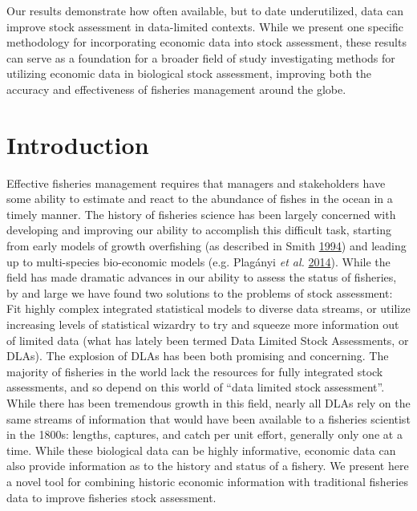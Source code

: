 \documentclass[twoside,12pt,final]{ucthesis-CA2012}
\begin{document}
\begin{ucmainmatter}
Our results demonstrate how often available, but to date underutilized,
data can improve stock assessment in data-limited contexts. While we
present one specific methodology for incorporating economic data into
stock assessment, these results can serve as a foundation for a broader
field of study investigating methods for utilizing economic data in
biological stock assessment, improving both the accuracy and
effectiveness of fisheries management around the globe.

\section{Introduction}\label{introduction-3}

Effective fisheries management requires that managers and stakeholders
have some ability to estimate and react to the abundance of fishes in
the ocean in a timely manner. The history of fisheries science has been
largely concerned with developing and improving our ability to
accomplish this difficult task, starting from early models of growth
overfishing (as described in Smith
\protect\hyperlink{ref-Smith1994}{1994}) and leading up to multi-species
bio-economic models (e.g. Plagányi \emph{et al.}
\protect\hyperlink{ref-Plaganyi2014}{2014}). While the field has made
dramatic advances in our ability to assess the status of fisheries, by
and large we have found two solutions to the problems of stock
assessment: Fit highly complex integrated statistical models to diverse
data streams, or utilize increasing levels of statistical wizardry to
try and squeeze more information out of limited data (what has lately
been termed Data Limited Stock Assessments, or DLAs). The explosion of
DLAs has been both promising and concerning. The majority of fisheries
in the world lack the resources for fully integrated stock assessments,
and so depend on this world of ``data limited stock assessment''. While
there has been tremendous growth in this field, nearly all DLAs rely on
the same streams of information that would have been available to a
fisheries scientist in the 1800s: lengths, captures, and catch per unit
effort, generally only one at a time. While these biological data can be
highly informative, economic data can also provide information as to the
history and status of a fishery. We present here a novel tool for
combining historic economic information with traditional fisheries data
to improve fisheries stock assessment.


\end{ucmainmatter}
\end{document}
